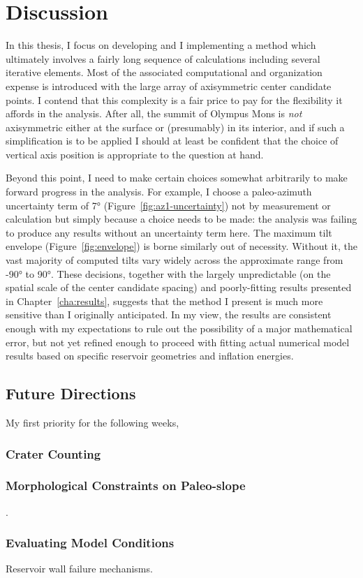 \chapter{Discussion}\label{cha:discussion}

In this thesis, I focus on developing and I implementing a method which ultimately involves a fairly long sequence of calculations including several iterative elements. Most of the associated computational and organization expense is introduced with the large array of axisymmetric center candidate points. I contend that this complexity is a fair price to pay for the flexibility it affords in the analysis. After all, the summit of Olympus Mons is \emph{not} axisymmetric either at the surface or (presumably) in its interior, and if such a simplification is to be applied I should at least be confident that the choice of vertical axis position is appropriate to the question at hand.

Beyond this point, I need to make certain choices somewhat arbitrarily to make forward progress in the analysis. For example, I choose a paleo-azimuth uncertainty term of \ang{7} (Figure~\ref{fig:az1-uncertainty}) not by measurement or calculation but simply because a choice needs to be made: the analysis was failing to produce any results without an uncertainty term here. The maximum tilt envelope (Figure~\ref{fig:envelope}) is borne similarly out of necessity. Without it, the vast majority of computed tilts vary widely across the approximate range from \ang{-90} to \ang{90}. These decisions, together with the largely unpredictable (on the spatial scale of the center candidate spacing) and poorly-fitting results presented in Chapter~\ref{cha:results}, suggests that the method I present is much more sensitive than I originally anticipated. In my view, the results are consistent enough with my expectations to rule out the possibility of a major mathematical error, but not yet refined enough to proceed with fitting actual numerical model results based on specific reservoir geometries and inflation energies.

\section{Future Directions}

My first priority for the following weeks,

\subsection{Crater Counting}
\textcite{kneissl_map-projection-independent_2011,robbins_volcanic_2011,
robbins_large_2013,
platz_crater-based_2013}

\subsection{Morphological Constraints on Paleo-slope}
\textcite{wadge_lobes_1991, peitersen_correlations_2000, peters_lava_2021}.

\subsection{Evaluating Model Conditions}

Reservoir wall failure mechanisms.

